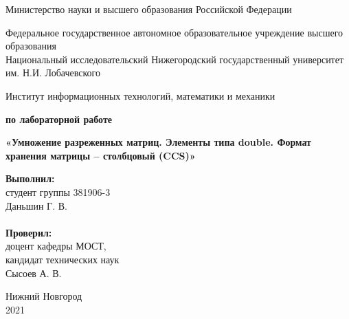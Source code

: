 \documentclass{report}
\begin{document}
\begin{titlepage}

\begin{center}
Министерство науки и высшего образования Российской Федерации
\end{center}

\begin{center}
Федеральное государственное автономное образовательное учреждение высшего образования \\
Национальный исследовательский Нижегородский государственный университет им. Н.И. Лобачевского
\end{center}

\begin{center}
Институт информационных технологий, математики и механики
\end{center}

\vspace{4em}

\begin{center}
\textbf{ по лабораторной работе} \\
\end{center}
\begin{center}
\textbf{\Large«Умножение разреженных матриц. Элементы типа double. Формат хранения матрицы – столбцовый (CCS)»} \\
\end{center}

\vspace{4em}

\newbox{\lbox}
\newlength{\maxl}
\setlength{\maxl}{\wd\lbox}
\hfill\parbox{7cm}{
\hspace*{5cm}\hspace*{-5cm}\textbf{Выполнил:} \\ студент группы 381906-3 \\ Даньшин Г. В. \\
\\
\hspace*{5cm}\hspace*{-5cm}\textbf{Проверил:}\\ доцент кафедры МОСТ, \\ кандидат технических наук \\ Сысоев А. В.\\
}
\vspace{\fill}

\begin{center} Нижний Новгород \\ 2021 \end{center}

\end{titlepage}
\end{document}
